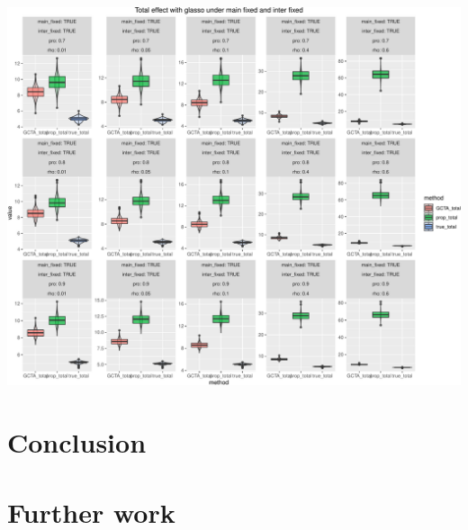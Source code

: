 \documentclass[]{article}
\begin{document}
\includegraphics{Simulation_report_glasso_files/figure-latex/fixed fixed total glasso-3.pdf}

\section{Conclusion}\label{conclusion}

\section{Further work}\label{further-work}
\end{document}
